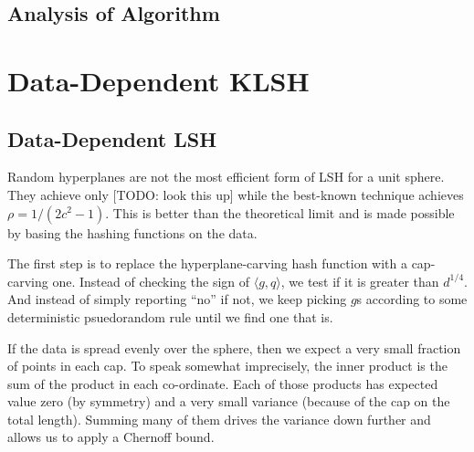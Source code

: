 \documentclass[twoside,11pt]{homework}
\begin{document}


\subsection{Analysis of Algorithm}

\section{Data-Dependent KLSH} %

\subsection{Data-Dependent LSH}

Random hyperplanes are not the most efficient form of LSH for a unit
sphere.  They achieve only [TODO: look this up] while the best-known
technique achieves $\rho=1/(2c^2-1)$.  This is better than the
theoretical limit and is made possible by basing the hashing functions
on the data.

The first step is to replace the hyperplane-carving hash function with
a cap-carving one.  Instead of checking the sign of $\langle g, q
\rangle$, we test if it is greater than $d^{1/4}$.  And
instead of simply reporting ``no'' if not, we keep picking $g$s
according to some deterministic psuedorandom rule until we find one
that is.

If the data is spread evenly over the sphere, then we expect a very
small fraction of points in each cap.  To speak somewhat imprecisely,
the inner product is the sum of the product in each co-ordinate.  Each
of those products has expected value zero (by symmetry) and a very
small variance (because of the cap on the total length).  Summing many
of them drives the variance down further and allows us to apply a
Chernoff bound.
\end{document}
